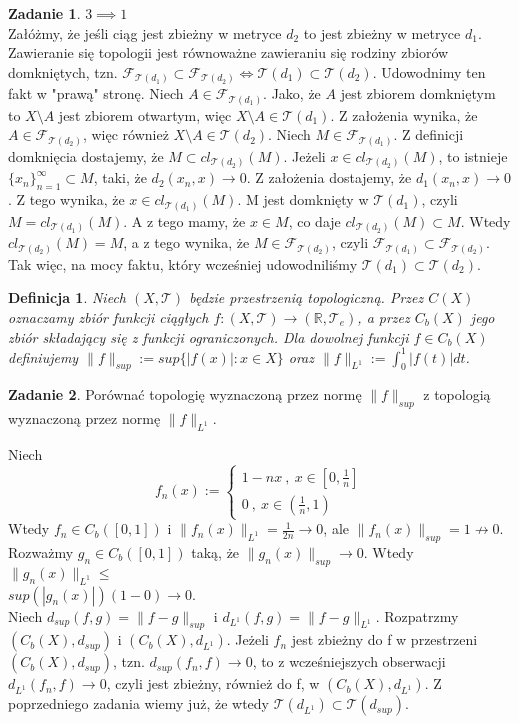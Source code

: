 \documentclass{article}
\theoremstyle{plain}%
\newtheorem{defn}{Definicja}
\theoremstyle{definition}
\newtheorem{zad}{Zadanie}
\begin{document}
\begin{zad}
		$3\implies1$\\
		Załóżmy, że jeśli ciąg jest zbieżny w metryce $d_2$ to jest zbieżny w metryce $d_1$. Zawieranie się topologii jest równoważne zawieraniu się rodziny zbiorów domkniętych, tzn. $\mathcal{F}_{\mathcal{T}(d_1)}\subset\mathcal{F}_{\mathcal{T}(d_2)}\Longleftrightarrow\mathcal{T}(d_1)\subset\mathcal{T}(d_2)$. Udowodnimy ten fakt w "prawą" stronę. Niech $A\in\mathcal{F}_{\mathcal{T}(d_1)}$. Jako, że $A$ jest zbiorem domkniętym to $X\setminus A$ jest zbiorem otwartym, więc $X\setminus A\in\mathcal{T}(d_1)$. Z założenia wynika, że $A\in\mathcal{F}_{\mathcal{T}(d_2)}$, więc również $X\setminus A\in\mathcal{T}(d_2)$. Niech $M\in\mathcal{F}_{\mathcal{T}(d_1)}$. Z definicji domknięcia dostajemy, że $M\subset cl_{\mathcal{T}(d_2)}(M)$. Jeżeli $x\in cl_{\mathcal{T}(d_2)}(M)$, to istnieje $\{x_n\}_{n=1}^\infty \subset M$, taki, że $d_2(x_n,x)\to 0$. Z założenia dostajemy, że $d_1(x_n,x)\to 0$. Z tego wynika, że $x\in cl_{\mathcal{T}(d_1)}(M)$. M jest domknięty w $\mathcal{T}(d_1)$, czyli $M=cl_{\mathcal{T}(d_1)}(M)$. A z tego mamy, że $x\in M$, co daje
		$cl_{\mathcal{T}(d_2)}(M)\subset M$. Wtedy $cl_{\mathcal{T}(d_2)}(M)=M$, a z tego wynika, że $M\in \mathcal{F}_{\mathcal{T}(d_2)}$, czyli  $\mathcal{F}_{\mathcal{T}(d_1)}\subset \mathcal{F}_{\mathcal{T}(d_2)}$. Tak więc, na mocy faktu, który wcześniej udowodniliśmy $\mathcal{T}(d_1)\subset\mathcal{T}(d_2)$.\\
	\end{zad}
	\begin{defn}
		Niech $(X,\mathcal{T})$ będzie przestrzenią topologiczną. Przez $C(X)$ oznaczamy zbiór
		funkcji ciągłych $f:(X,\mathcal{T}) \to (\mathbb{R},\mathcal{T}_{e})$, a przez $C_{b}(X)$ jego zbiór składający się z funkcji ograniczonych. Dla dowolnej funkcji $f \in C_{b}(X)$ definiujemy $\|f\|_{sup}:=sup\{|f(x)|:x \in X\}$ oraz $\|f\|_{L^1}:=\int_0^1 |f(t)| dt$.
	\end{defn}
	\begin{zad}
		Porównać topologię wyznaczoną przez normę $\|f\|_{sup}$ z topologią wyznaczoną przez normę $\|f\|_{L^1}$.
	\end{zad}
	Niech
	\[f_{n}(x):= \begin{cases} 
	1-nx\ ,\ x \in [0,\frac{1}{n}]\\
	0\ ,\ x \in (\frac{1}{n},1)
	\end{cases}\] Wtedy  $f_{n} \in C_{b}([0,1])$ i  $\|f_{n}(x)\|_{L^1}=\frac{1}{2n} \to 0$, ale
	$\|f_{n}(x)\|_{sup}=1 \not\to 0$.\\
	Rozważmy $g_{n} \in C_{b}([0,1])$ taką, że $\|g_{n}(x)\|_{sup} \to 0$.
	Wtedy $\|g_{n}(x)\|_{L^1}\leq$\\ $sup(|g_{n}(x)|)(1-0)\to 0$.\\
	Niech $d_{sup}(f,g)=\|f-g\|_{sup}$ i $d_{L^1}(f,g)=\|f-g\|_{L^1}$.
	Rozpatrzmy $(C_{b}(X), d_{sup})$  i $(C_{b}(X), d_{L^1})$. Jeżeli $f_n$ jest zbieżny do f w przestrzeni $(C_{b}(X), d_{sup})$, tzn. $d_{sup}(f_n,f)\to0$, to z wcześniejszych obserwacji $d_{L^1}(f_n,f)\to0$, czyli jest zbieżny, również do f, w $(C_{b}(X), d_{L^1})$. Z poprzedniego zadania wiemy już, że wtedy $\mathcal{T}(d_{L^1})\subset\mathcal{T}(d_{sup})$.
\end{document}
